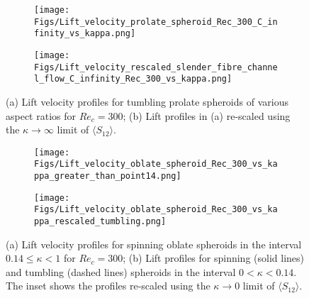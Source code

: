 \documentclass{jfm}
\begin{document}
\begin{figure}
	\centering
    \begin{subfigure}[b]{0.49\textwidth}
		\texttt{[image: Figs/Lift\_velocity\_prolate\_spheroid\_Rec\_300\_C\_infinity\_vs\_kappa.png]}
        \caption{}
    \end{subfigure}
    \hfill
    \begin{subfigure}[b]{0.49\textwidth}
		\texttt{[image: Figs/Lift\_velocity\_rescaled\_slender\_fibre\_channel\_flow\_C\_infinity\_Rec\_300\_vs\_kappa.png]}
        \caption{}
    \end{subfigure}
	\caption{(a) Lift velocity profiles for tumbling prolate spheroids of various aspect ratios for $Re_c=300$; (b) Lift profiles in (a) re-scaled using the $\kappa\to\infty$ limit of $\langle S_{12}\rangle$.}
\label{fig:Ch3VpTumblingProlatevskappaRec300}
\end{figure}

\begin{figure}
	\centering
    \begin{subfigure}[b]{0.49\textwidth}
		\texttt{[image: Figs/Lift\_velocity\_oblate\_spheroid\_Rec\_300\_vs\_kappa\_greater\_than\_point14.png]}
        \caption{}
    \end{subfigure}
    \hfill
    \begin{subfigure}[b]{0.49\textwidth}
		\texttt{[image: Figs/Lift\_velocity\_oblate\_spheroid\_Rec\_300\_vs\_kappa\_rescaled\_tumbling.png]}
        \caption{}
    \end{subfigure}
	\caption{(a) Lift velocity profiles for spinning oblate spheroids in the interval $0.14\leq\kappa<1$ for $Re_c=300$; (b) Lift profiles for spinning (solid lines) and tumbling (dashed lines) spheroids in the interval $0<\kappa<0.14$. The inset shows the profiles re-scaled using the $\kappa\to0$ limit of $\langle S_{12}\rangle$.}
\label{fig:Ch3VpTumblingOblatevskappaRec300}
\end{figure}

\end{document}

